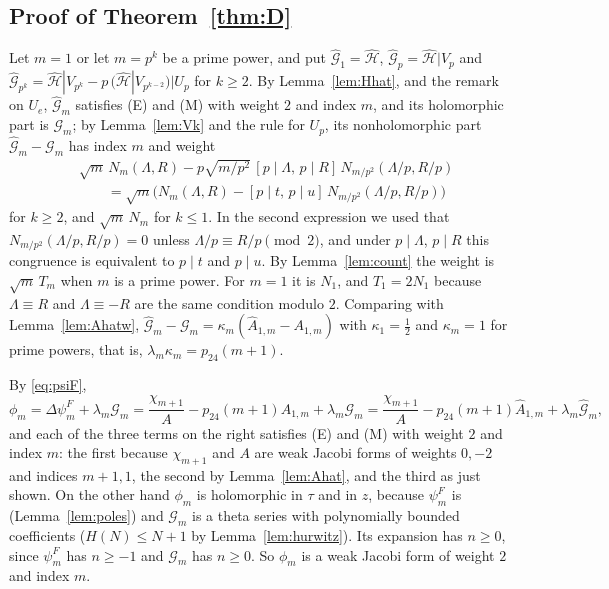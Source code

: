 \documentclass[11pt]{amsart}
\theoremstyle{definition}
\newcommand{\pf}{p_{24}}
\newcommand{\Hh}{\widehat{\mathcal{H}}}
\newcommand{\Ah}{\widehat{A}}
\begin{document}
\subsection{Proof of Theorem~\ref{thm:D}}
Let $m=1$ or let $m=p^k$ be a prime power, and put $\widehat{\mathcal G}_1=\Hh$, $\widehat{\mathcal G}_p=\Hh|V_p$ and $\widehat{\mathcal G}_{p^k}=\Hh|V_{p^k}-p\,(\Hh|V_{p^{k-2}})|U_p$ for $k\ge2$. By Lemma~\ref{lem:Hhat}, \cite[Thm.~4.2]{EZ85} and the remark on $U_e$, $\widehat{\mathcal G}_m$ satisfies (E) and (M) with weight $2$ and index $m$, and its holomorphic part is $\mathcal G_m$; by Lemma~\ref{lem:Vk} and the rule for $U_p$, its nonholomorphic part $\widehat{\mathcal G}_m-\mathcal G_m$ has index $m$ and weight
\begin{align*}
&\sqrt m\,N_m(\Lambda,R)-p\sqrt{m/p^2}\,[p\mid\Lambda,\,p\mid R]\,N_{m/p^2}(\Lambda/p,R/p)\\
&\qquad=\sqrt m\bigl(N_m(\Lambda,R)-[p\mid t,\,p\mid u]\,N_{m/p^2}(\Lambda/p,R/p)\bigr)
\end{align*}
for $k\ge2$, and $\sqrt m\,N_m$ for $k\le1$. In the second expression we used that $N_{m/p^2}(\Lambda/p,R/p)=0$ unless $\Lambda/p\equiv R/p\pmod 2$, and under $p\mid\Lambda$, $p\mid R$ this congruence is equivalent to $p\mid t$ and $p\mid u$. By Lemma~\ref{lem:count} the weight is $\sqrt m\,T_m$ when $m$ is a prime power. For $m=1$ it is $N_1$, and $T_1=2N_1$ because $\Lambda\equiv R$ and $\Lambda\equiv-R$ are the same condition modulo $2$. Comparing with Lemma~\ref{lem:Ahatw}, $\widehat{\mathcal G}_m-\mathcal G_m=\kappa_m(\Ah_{1,m}-A_{1,m})$ with $\kappa_1=\frac12$ and $\kappa_m=1$ for prime powers, that is, $\lambda_m\kappa_m=\pf(m+1)$.

By \eqref{eq:psiF},
\[
\phi_m=\Delta\psi^F_m+\lambda_m\mathcal G_m=\frac{\chi_{m+1}}{A}-\pf(m+1)A_{1,m}+\lambda_m\mathcal G_m=\frac{\chi_{m+1}}{A}-\pf(m+1)\Ah_{1,m}+\lambda_m\widehat{\mathcal G}_m,
\]
and each of the three terms on the right satisfies (E) and (M) with weight $2$ and index $m$: the first because $\chi_{m+1}$ and $A$ are weak Jacobi forms of weights $0,-2$ and indices $m+1,1$, the second by Lemma~\ref{lem:Ahat}, and the third as just shown. On the other hand $\phi_m$ is holomorphic in $\tau$ and in $z$, because $\psi^F_m$ is (Lemma~\ref{lem:poles}) and $\mathcal G_m$ is a theta series with polynomially bounded coefficients ($H(N)\le N+1$ by Lemma~\ref{lem:hurwitz}). Its expansion has $n\ge0$, since $\psi^F_m$ has $n\ge-1$ and $\mathcal G_m$ has $n\ge0$. So $\phi_m$ is a weak Jacobi form of weight $2$ and index $m$.
\end{document}
